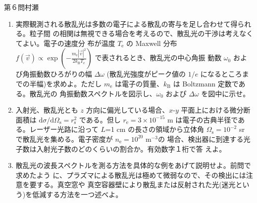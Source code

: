 \begin{question}{第６問}{村瀬}
\begin{enumerate}
\item
  実際観測される散乱光は多数の電子による散乱の寄与を足し合わせて得られる。粒子間
  の相関は無視できる場合を考えるので、散乱光の干渉は考えなくてよい。電子の速度分
  布が温度 $T_\mathrm{e}$ の Maxwell 分布
  $\displaystyle f(\vec v)\propto \exp\left(-\frac{m_\mathrm{e}|\vec v|^2}{2k_\mathrm{B}T_\mathrm{e}}\right)$
  で表されるとき、散乱光の中心角振
  動数 $\omega_0$ および角振動数ひろがりの幅 $\Delta\omega$ (散乱光強度がピーク値の $1/e$ になるところま
  での半幅)を求めよ。ただし $m_\mathrm{e}$ は電子の質量、$k_\mathrm{B}$ は Boltzmann 定数である。散乱光の
  角振動数スペクトルを図示し、$\omega_0$ およぴ $\Delta\omega$ を図中に示せ。
\item
  入射光、散乱光とも $z$ 方向に偏光している場合、$x$-$y$ 平面上における微分断面積は $\mathrm d\sigma/\mathrm d\Omega_\mathrm{s}=r_\mathrm{s}^2$
  である。但し $r_\mathrm{e}=3\times10^{-15}$ m は電子の古典半径である。レーザー光路に沿って $L$=1 cm
  の長さの領域から立体角 $\Omega_\mathrm{s}=10^{-2}$ sr で散乱光を集める。電子密度が $n_\mathrm{e}=10^{20}$ m${}^{-3}$の
  場合、検出器に到達する光子数は入射光子数のどのくらいの割合か。有効数字１桁で答
  えよ。
\item
  散乱光の波長スペクトルを測る方法を具体的な例をあげて説明せよ。前問で求めたよう
  に、プラズマによる散乱光は極めて微弱なので、その検出には注意を要する。真空窓や
  真空容器壁により散乱または反射された光(迷光という)を低減する方法を一つ述べよ。
\end{enumerate}
\end{question}
